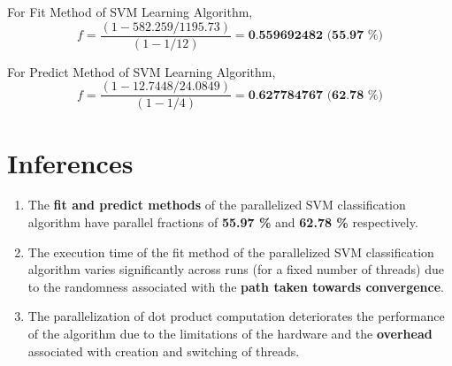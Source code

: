 \documentclass{article}
\begin{document}
	
	For Fit Method of SVM Learning Algorithm,
	\[
		f = \frac{(1-582.259/1195.73)}{(1-1/12)} = \textbf{0.559692482 (55.97 \%)}
	\]
	
	For Predict Method of SVM Learning Algorithm,
	\[
		f = \frac{(1-12.7448/24.0849)}{(1-1/4)} = \textbf{0.627784767 (62.78 \%)}
	\]
	
\section{Inferences}

	\begin{enumerate}
		\item The \textbf{fit and predict methods} of the parallelized SVM classification algorithm have parallel fractions of \textbf{55.97 \%} and \textbf{62.78 \%} respectively.
		
		\item The execution time of the fit method of the parallelized SVM classification algorithm varies significantly across runs (for a fixed number of threads) due to the randomness associated with the \textbf{path taken towards convergence}.
		
		\item The parallelization of dot product computation deteriorates the performance of the algorithm due to the limitations of the hardware and the \textbf{overhead} associated with creation and switching of threads.
		
	\end{enumerate}
\pagebreak
\end{document}
